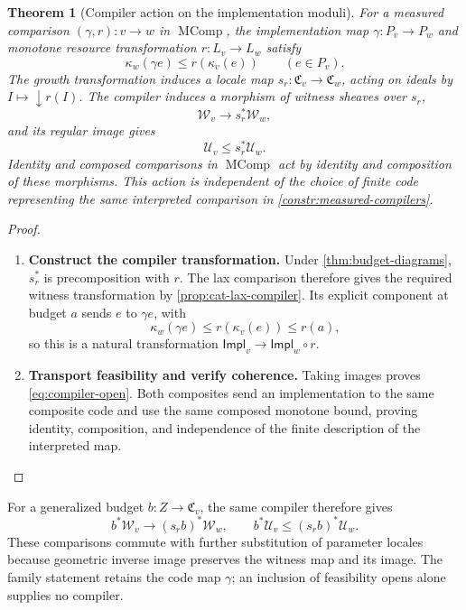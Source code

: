 \documentclass[11pt,a4paper]{article}
\numberwithin{algorithm}{section}
\numberwithin{equation}{section}
\newtheorem{theorem}{Theorem}[section]
\theoremstyle{definition}
\theoremstyle{remark}
\theoremstyle{plain}
\newcommand{\MComp}{\operatorname{MComp}}
\theoremstyle{definition}
\theoremstyle{plain}
\begin{document}
\begin{theorem}[Compiler action on the implementation moduli]
\label{thm:compiler-sheaves}
For a measured comparison $(\gamma,r):v\to w$ in
$\MComp$, the implementation map $\gamma:P_v\to P_w$ and monotone
resource transformation $r:L_v\to L_w$ satisfy
\begin{equation}\label{eq:compiler-moduli-bound}
 \kappa_w(\gamma e)\le r(\kappa_v(e))\qquad(e\in P_v).
\end{equation}
The growth transformation induces a locale map
$s_r:\mathfrak C_v\to\mathfrak C_w$, acting on ideals by
$I\mapsto\downarrow r(I)$.  The compiler induces a morphism
of witness sheaves over $s_r$,
\[
 \mathscr W_v\longrightarrow s_r^*\mathscr W_w,
\]
and its regular image gives
\begin{equation}\label{eq:compiler-open}
 \mathcal U_v\le s_r^*\mathcal U_w.
\end{equation}
Identity and composed comparisons in $\MComp$ act by identity and
composition of these morphisms. This action is independent of the
choice of finite code representing the same interpreted comparison
in \cref{constr:measured-compilers}.
\end{theorem}
\begin{proof}\leavevmode
\begin{enumerate}[leftmargin=*,align=left]
\item \textbf{Construct the compiler transformation.}
Under \cref{thm:budget-diagrams}, $s_r^*$ is precomposition with $r$.
The lax comparison therefore gives the required witness transformation
by \cref{prop:cat-lax-compiler}.  Its explicit component at budget $a$
sends $e$ to $\gamma e$, with
\[
 \kappa_w(\gamma e)\le r(\kappa_v(e))\le r(a),
\]
so this is a natural transformation
$\mathsf{Impl}_v\to\mathsf{Impl}_w\circ r$.

\item \textbf{Transport feasibility and verify coherence.}
Taking images proves \eqref{eq:compiler-open}. Both composites
send an implementation to the same composite code and use the
same composed monotone bound, proving identity, composition,
and independence of the finite description of the interpreted map.
\end{enumerate}
\end{proof}


For a generalized budget $b:Z\to\mathfrak C_v$, the same compiler
therefore gives
\[
 b^*\mathscr W_v\longrightarrow(s_rb)^*\mathscr W_w,
 \qquad b^*\mathcal U_v\le(s_rb)^*\mathcal U_w.
\]
These comparisons commute with further substitution of parameter
locales because geometric inverse image preserves the witness map
and its image.  The family statement retains the code map
$\gamma$; an inclusion of feasibility opens alone supplies no compiler.
\end{document}
